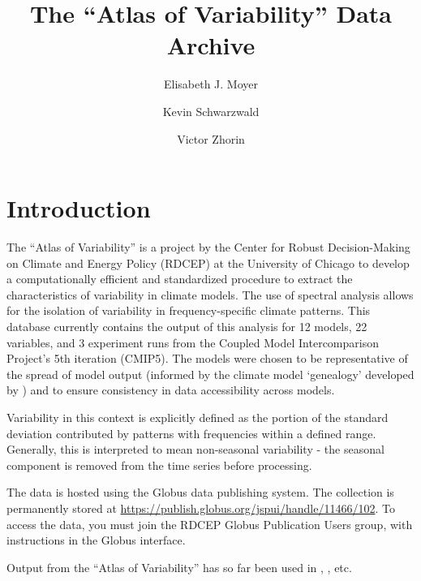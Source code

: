 \documentclass[11pt]{amsart}
\title{The ``Atlas of Variability'' Data Archive}
\author{Elisabeth J. Moyer}
\author{Kevin Schwarzwald}
\author{Victor Zhorin}
\begin{document}
\sloppy
\maketitle
\section{Introduction}
The ``Atlas of Variability'' is a project by the Center for Robust Decision-Making on Climate and Energy Policy (RDCEP) at the University of Chicago to develop a computationally efficient and standardized procedure to extract the characteristics of variability in climate models. The use of spectral analysis allows for the isolation of variability in frequency-specific climate patterns. This database currently contains the output of this analysis for 12 models, 22 variables, and 3 experiment runs from the Coupled Model Intercomparison Project's 5th iteration (CMIP5). The models were chosen to be representative of the spread of model output (informed by the climate model `genealogy' developed by \cite{knutti_climate_2013}) and to ensure consistency in data accessibility across models.

Variability in this context is explicitly defined as the portion of the standard deviation contributed by patterns with frequencies within a defined range. Generally, this is interpreted to mean non-seasonal variability - the seasonal component is removed from the time series before processing. 

The data is hosted using the Globus data publishing system. The collection is permanently stored at \url{https://publish.globus.org/jspui/handle/11466/102}. To access the data, you must join the RDCEP Globus Publication Users group, with instructions in the Globus interface. 

Output from the ``Atlas of Variability'' has so far been used in \cite{moyer_2017_changes}, \cite{schwarzwald_2017_temperature}, etc.
\end{document}
